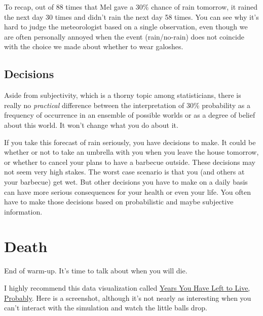 \documentclass[openany]{book}
\begin{document}
To recap, out of 88 times that Mel gave a 30\% chance of rain tomorrow, it rained the next day 30 times and didn't rain the next day 58 times. You can see why it's hard to judge the meteorologist based on a single observation, even though we are often personally annoyed when the event (rain/no-rain) does not coincide with the choice we made about whether to wear galoshes.

\hypertarget{decisions}{%
\subsection*{Decisions}\label{decisions}}

Aside from subjectivity, which is a thorny topic among statisticians, there is really no \emph{practical} difference between the interpretation of 30\% probability as a frequency of occurrence in an ensemble of possible worlds or as a degree of belief about this world. It won't change what you do about it.

If you take this forecast of rain seriously, you have decisions to make. It could be whether or not to take an umbrella with you when you leave the house tomorrow, or whether to cancel your plans to have a barbecue outside. These decisions may not seem very high stakes. The worst case scenario is that you (and others at your barbecue) get wet. But other decisions you have to make on a daily basis can have more serious consequences for your health or even your life. You often have to make those decisions based on probabilistic and maybe subjective information.

\hypertarget{death}{%
\section*{Death}\label{death}}

End of warm-up. It's time to talk about when you will die.

I highly recommend this data visualization called \href{https://flowingdata.com/2015/09/23/years-you-have-left-to-live-probably/}{Years You Have Left to Live, Probably}. Here is a screenshot, although it's not nearly as interesting when you can't interact with the simulation and watch the little balls drop.
\end{document}
